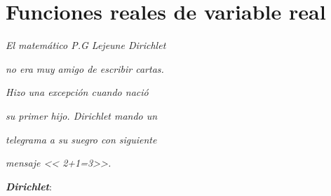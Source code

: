 \documentclass[oneside,spanish,2m,twoside,svgnames,x11names,HTML,12pt]{libro-matua}\usepackage[]{graphicx}\usepackage[]{color}
\begin{document}
\chapter{Funciones reales de variable real}

\PartialToc

\hypersetup{linkcolor=ptctitle}

\vspace*{0.5cm}
 
\begin{flushright}
\textit{\footnotesize{}El matemático P.G Lejeune Dirichlet }
\par\end{flushright}{\footnotesize \par}

\begin{flushright}
\textit{\footnotesize{}no era muy amigo de escribir cartas.}
\par\end{flushright}{\footnotesize \par}

\begin{flushright}
\textit{\footnotesize{}Hizo una excepción cuando nació }
\par\end{flushright}{\footnotesize \par}

\begin{flushright}
\textit{\footnotesize{}su primer hijo. Dirichlet mando un }
\par\end{flushright}{\footnotesize \par}

\begin{flushright}
\textit{\footnotesize{}telegrama a su suegro con siguiente }
\par\end{flushright}{\footnotesize \par}

\begin{flushright}
\textit{\footnotesize{}mensaje << 2+1=3>>. }
\par\end{flushright}{\footnotesize \par}

\begin{flushright}
{\small{} }\textbf{\textit{Dirichlet}}: 
\par\end{flushright}
\end{document}
